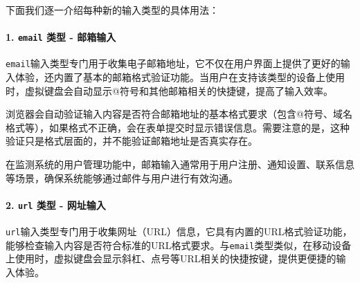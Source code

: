 下面我们逐一介绍每种新的输入类型的具体用法：

\paragraph{\texorpdfstring{1. \texttt{email} 类型 - 邮箱输入}{1. email 类型 - 邮箱输入}}\label{email-ux7c7bux578b---ux90aeux7bb1ux8f93ux5165}

\texttt{email}输入类型专门用于收集电子邮箱地址，它不仅在用户界面上提供了更好的输入体验，还内置了基本的邮箱格式验证功能。当用户在支持该类型的设备上使用时，虚拟键盘会自动显示@符号和其他邮箱相关的快捷键，提高了输入效率。

浏览器会自动验证输入内容是否符合邮箱地址的基本格式要求（包含@符号、域名格式等），如果格式不正确，会在表单提交时显示错误信息。需要注意的是，这种验证只是格式层面的，并不能验证邮箱地址是否真实存在。

在监测系统的用户管理功能中，邮箱输入通常用于用户注册、通知设置、联系信息等场景，确保系统能够通过邮件与用户进行有效沟通。

\begin{Shaded}
\begin{Highlighting}[]
\DataTypeTok{\textless{}}\OperatorTok{=}\DataTypeTok{\textgreater{}}\DataTypeTok{\textless{}/}\DataTypeTok{\textgreater{}}
\DataTypeTok{\textless{}}\OperatorTok{=}\OtherTok{ }
\OperatorTok{=}\OtherTok{ }
\OperatorTok{=}\OtherTok{ }
\OperatorTok{=}
\OperatorTok{=}\DataTypeTok{\textgreater{}}
\end{Highlighting}
\end{Shaded}

\paragraph{\texorpdfstring{2. \texttt{url} 类型 - 网址输入}{2. url 类型 - 网址输入}}\label{url-ux7c7bux578b---ux7f51ux5740ux8f93ux5165}

\texttt{url}输入类型专门用于收集网址（URL）信息，它具有内置的URL格式验证功能，能够检查输入内容是否符合标准的URL格式要求。与\texttt{email}类型类似，在移动设备上使用时，虚拟键盘会显示斜杠、点号等URL相关的快捷按键，提供更便捷的输入体验。

